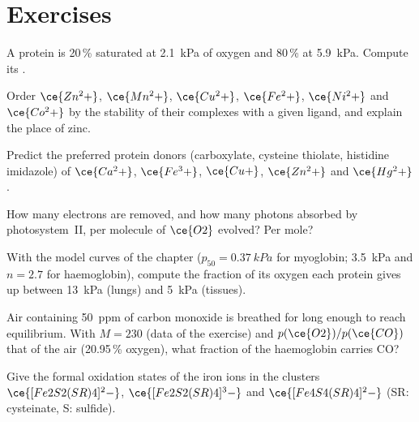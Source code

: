 \section{Exercises}

\begin{exercise}[$\star$]\label{exo:b3:bioinorganic:1}
A protein is 20\,\% saturated at \qty{2.1}{kPa} of oxygen and 80\,\% at \qty{5.9}{kPa}. Compute its
.
\end{exercise}

\begin{exercise}[$\star$]\label{exo:b3:bioinorganic:2}
Order $\ce{Zn^2+}$, $\ce{Mn^2+}$, $\ce{Cu^2+}$, $\ce{Fe^2+}$, $\ce{Ni^2+}$ and $\ce{Co^2+}$ by the stability of their complexes with
a given ligand, and explain the place of zinc.
\end{exercise}

\begin{exercise}[$\star$]\label{exo:b3:bioinorganic:3}
Predict the preferred protein donors (carboxylate, cysteine thiolate,
histidine imidazole) of $\ce{Ca^2+}$, $\ce{Fe^3+}$, $\ce{Cu+}$, $\ce{Zn^2+}$ and $\ce{Hg^2+}$.
\end{exercise}

\begin{exercise}[$\star$]\label{exo:b3:bioinorganic:4}
How many electrons are removed, and how many photons absorbed by photosystem~II,
per molecule of $\ce{O2}$ evolved? Per mole?
\end{exercise}

\begin{exercise}[$\star\star$]\label{exo:b3:bioinorganic:5}
With the model curves of the chapter ($p_{50} = \qty{0.37}{kPa}$ for myoglobin; \qty{3.5}{kPa} and $n = 2.7$ for
haemoglobin), compute the fraction of its oxygen each protein gives up between
\qty{13}{kPa} (lungs) and \qty{5}{kPa} (tissues).
\end{exercise}

\begin{exercise}[$\star\star$]\label{exo:b3:bioinorganic:6}
Air containing \qty{50}{ppm} of carbon monoxide is breathed for long enough to reach
equilibrium. With $M = 230$ (data of the exercise) and $p(\ce{O2})/p(\ce{CO})$ that of the air
(20.95\,\% oxygen), what fraction of the haemoglobin carries CO?
\end{exercise}

\begin{exercise}[$\star\star$]\label{exo:b3:bioinorganic:7}
Give the formal oxidation states of the iron ions in the clusters $\ce{[Fe2S2(SR)4]^2-}$,
$\ce{[Fe2S2(SR)4]^3-}$ and $\ce{[Fe4S4(SR)4]^2-}$ (SR: cysteinate, S: sulfide).
\end{exercise}


